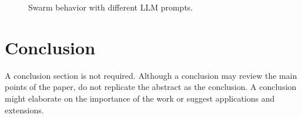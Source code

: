\documentclass{ifacconf}
\begin{document}
\begin{figure}[!t]
   \caption{Swarm behavior with different LLM prompts.}
   \label{fig:llmexp}
\end{figure}

\section{Conclusion}

A conclusion section is not required. Although a conclusion may review
the main points of the paper, do not replicate the abstract as the
conclusion. A conclusion might elaborate on the importance of the work
or suggest applications and extensions.


\end{document}
